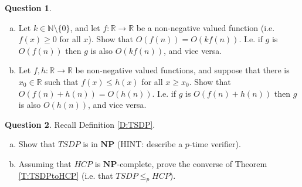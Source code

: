 \documentclass{article}
\theoremstyle{definition}
\newtheorem{Q}{Question}
\newcommand{\NP}{\mathbf{NP}}
\newcommand{\bbN}{\mathbb{N}}
\newcommand{\bbR}{\mathbb{R}}
\begin{document}
\begin{Q}
\mbox{}
\begin{enumerate}[a)]
\item Let $k\in\bbN\setminus\{0\}$, and let $f:\bbR\to\bbR$ be a non-negative valued function (i.e. $f(x)\geq 0$ for all $x$). Show that $O(f(n))=O(kf(n))$. I.e. if $g$ is $O(f(n))$ then $g$ is also $O(kf(n))$, and vice versa.
\item Let $f,h:\bbR\to\bbR$ be non-negative valued functions, and suppose that there is $x_0\in\bbR$ such that $f(x)\leq h(x)$ for all $x\geq x_0$. Show that $O(f(n)+h(n))= O(h(n))$. I.e. if $g$ is $O(f(n)+h(n))$ then $g$ is also $O(h(n))$, and vice versa.
\end{enumerate}
\end{Q}
\begin{comment}
\textbf{Solution}
\begin{enumerate}[a)]
\item If $g$ is $O(f(n))$ there is a constant $c$ with $|g(n)|\leq cf(n)$ for large $n$. Clearly $|g(n)|\leq ckf(n)$ too, so $g$ is $O(kf(n))$. Conversely, if $g$ is $O(kf(n))$ there is a constant $c$ with $|g(n)|\leq ckf(n)$ for large $n$. But then $g$ is also $O(f(n))$ as we can use $ck$ for the constant. 
\item If $g$ is $O(f(n)+h(n))$ there is $c$ with $|g(n)|\leq c(f(n)+h(n))$ for all large $n$. By assumption, for large enough $n$ we also have $f(n)\leq h(n)$, so for values of $n$ that are `large' by both measures we have $|g(n)|\leq c(f(n)+h(n)) \leq 2ch(n)$. So $g$ is also $O(h(n))$, using the constant value $2c$. Conversely, if $|g(n)|\leq cf(n)$, then $|g(n)|\leq c(f(n)+h(n))$, as $f$ and $h$ are non-negative valued. So if $g$ is $O(h(n))$ it is also $O(f(n)+h(n))$. 
\end{enumerate}
\end{comment}


\begin{Q}
Recall Definition \ref{D:TSDP}. 
\begin{enumerate}[a)]
\item Show that $TSDP$ is in $\NP$ (HINT: describe a $p$-time verifier). 
\item Assuming that $HCP$ is $\NP$-complete, prove the converse of Theorem \ref{T:TSDPtoHCP} (i.e. that $TSDP\leq_p HCP$).
\end{enumerate}
\end{Q}
\begin{comment}
\textbf{Solution}
\begin{enumerate}[a)]
\item The certificates for the verifier are (coded forms of) sequences of vertices. The verifier checks if a given certificate defines a Hamiltonian circuit with an appropriate weight. It accepts if so, and rejects otherwise.
\item $TSDP\leq_p HCP$ by $NP$-hardness of $HCP$.
\end{enumerate}
\end{comment}
\end{document}
